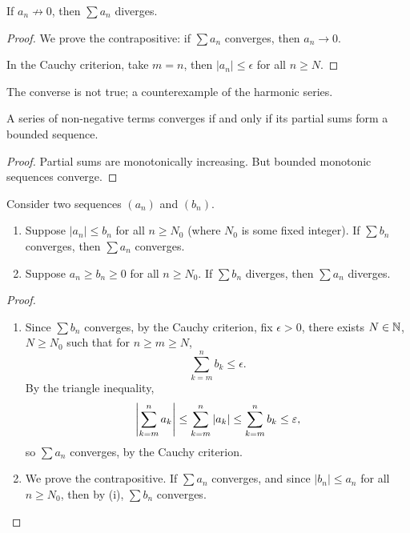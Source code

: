 \begin{lemma}\label{lemma:divergence-test}
If $a_n\not\to0$, then $\sum a_n$ diverges.
\end{lemma}

\begin{proof}
We prove the contrapositive: if $\sum a_n$ converges, then $a_n\to0$.

In the Cauchy criterion, take $m=n$, then $|a_n|\le\epsilon$ for all $n\ge N$.
\end{proof}

\begin{remark}
The converse is not true; a counterexample of the harmonic series.
\end{remark}

\begin{lemma}\label{lemma:bounded-partial-sums}
A series of non-negative terms converges if and only if its partial sums form a bounded sequence.
\end{lemma}

\begin{proof}
Partial sums are monotonically increasing. But bounded monotonic sequences converge.
\end{proof}

\begin{lemma}\label{lemma:comparison-test}
Consider two sequences $(a_n)$ and $(b_n)$.
\begin{enumerate}[label=(\roman*)]
\item Suppose $|a_n|\le b_n$ for all $n\ge N_0$ (where $N_0$ is some fixed integer). If $\sum b_n$ converges, then $\sum a_n$ converges.
\item Suppose $a_n\ge b_n\ge0$ for all $n\ge N_0$. If $\sum b_n$ diverges, then $\sum a_n$ diverges.
\end{enumerate}
\end{lemma}

\begin{proof} \
\begin{enumerate}[label=(\roman*)]
\item Since $\sum b_n$ converges, by the Cauchy criterion, fix $\epsilon>0$, there exists $N\in\mathbb N$, $N\ge N_0$ such that for $n\ge m\ge N$,
\[\sum_{k=m}^{n}b_k\le\epsilon.\]
By the triangle inequality,
\[\left|\sum_{k=m}^{n}a_k\right|\le\sum_{k=m}^{n}|a_k|\le\sum_{k=m}^{n}b_k\le\varepsilon,\]
so $\sum a_n$ converges, by the Cauchy criterion.

\item We prove the contrapositive. If $\sum a_n$ converges, and since $|b_n|\le a_n$ for all $n\ge N_0$, then by (i), $\sum b_n$ converges.
\end{enumerate}
\end{proof}

